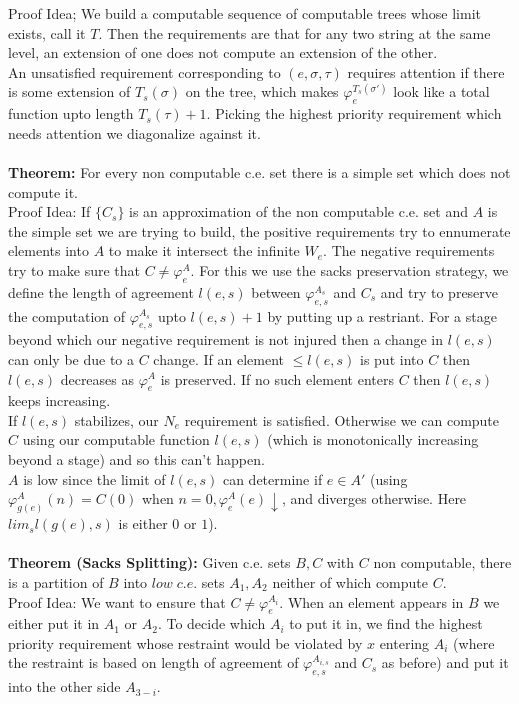 \documentclass{article}
\begin{document}
	Proof Idea; We build a computable sequence of computable trees whose limit exists, call it $T$. Then the requirements are that for any two string at the same level, an extension of one does not compute an extension of the other.\\An unsatisfied requirement corresponding to $(e,\sigma,\tau)$ requires attention if there is some extension of $T_s(\sigma)$  on the tree, which makes  $\varphi_e^{T_s(\sigma')}$ look like a total function upto length $T_s(\tau)+1$. Picking the highest priority requirement which needs attention we diagonalize against it.\\
	\\
	\textbf{Theorem:} For every non computable c.e. set there is a simple set which does not compute it.\\
	Proof Idea: If $\{C_s\}$ is an approximation of the non computable c.e. set and $A$ is the simple set we are trying to build, the positive requirements try to ennumerate elements into $A$ to make it intersect the infinite $W_e$. The negative requirements try to make sure that $C \neq \varphi_e^A$. For this we use the sacks preservation strategy, we define the length of agreement $l(e,s)$ between $\varphi_{e,s}^{A_s}$ and $C_s$ and try to preserve the computation of $\varphi_{e,s}^{A_s}$ upto $l(e,s)+1$ by putting up a restriant. For a stage beyond which our negative requirement is not injured then a change in $l(e,s)$ can only be due to a $C$ change. If an element $\leq l(e,s)$ is put into $C$ then $l(e,s)$ decreases as $\varphi_e^A$ is preserved. If no such element enters $C$ then $l(e,s)$ keeps increasing.\\ If $l(e,s)$ stabilizes, our $N_e$ requirement is satisfied. Otherwise we can compute $C$ using our computable function $l(e,s)$ (which is monotonically increasing beyond a stage) and so this can't happen.\\
	$A$ is low since the limit of $l(e,s)$ can determine if $e\in A'$ (using $\varphi_{g(e)}^A(n) = C(0)   $ when $n=0, \varphi_e^A(e)\downarrow$, and diverges otherwise. Here $lim_s l(g(e),s)$ is either $0$ or $1$).\\
	\\
	\textbf{Theorem (Sacks Splitting):} Given c.e. sets $B,C$ with $C$ non computable, there is a partition of $B$ into $low \; c.e.$ sets $A_1,A_2$ neither of which compute $C$.\\
	Proof Idea: We want to ensure that $C \neq \varphi_e^{A_i}$. When an element appears in $B$ we either put it in $A_1$ or $A_2$. To decide which $A_i$ to put it in, we find the highest priority requirement whose restraint would be violated by $x$ entering $A_i$ (where the restraint is based on length of agreement of $\varphi_{e,s}^{A_{i,s}}$ and $C_s$ as before) and put it into the other side $A_{3-i}$.\newpage
\end{document}

